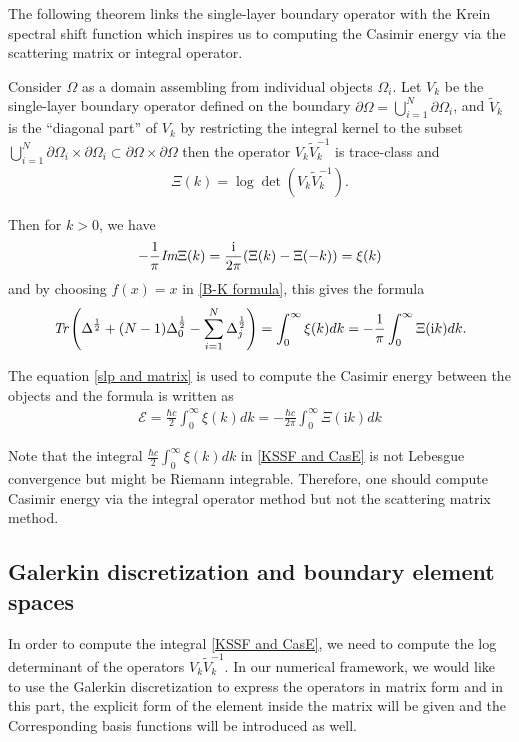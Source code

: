 The following theorem links the single-layer boundary operator with the Krein spectral shift function which inspires us to computing the Casimir energy 
via the scattering matrix or integral operator. 
\begin{theorem}\cite{hanisch2020relative}
    Consider $\Omega$ as a domain assembling from individual objects $\Omega_{i}$. Let $V_{k}$ be the single-layer boundary operator defined on the boundary 
    $\partial\Omega = \bigcup_{i = 1}^{N}\partial\Omega_{i}$, and $\tilde{V}_{k}$ is the ``diagonal part'' of $V_{k}$ by restricting the integral 
    kernel to the subset $\bigcup_{i = 1}^{N}\partial\Omega_{i}\times\partial\Omega_{i}\subset\partial\Omega\times\partial\Omega$ then the operator 
    $V_{k}\tilde{V}_{k}^{-1}$ is trace-class and 
    \begin{align*}
        \Xi(k) = \log\det\left(V_{k}\tilde{V}_{k}^{-1}\right).
    \end{align*}

    Then for $k >0$, we have 
    \begin{align*}
        -\frac{1}{\pi}\emph{\text{Im}}\Xi(k) = \frac{\mathrm{i}}{2\pi}(\Xi(k) - \Xi(-k)) = \xi(k)
    \end{align*}
    and by choosing $f(x) = x$ in \eqref{B-K formula}, this gives the formula 
    \begin{align}\label{slp and matrix}
        \emph{\text{Tr}}\left(\Delta^{\frac{1}{2}} + (N - 1)\Delta_{0}^{\frac{1}{2}} - \sum_{i = 1}^{N}\Delta_{j}^{\frac{1}{2}}\right)  = 
        \int_{0}^{\infty}\xi(k)dk = -\frac{1}{\pi}\int_{0}^{\infty}\Xi(\mathrm{i}k)dk.
    \end{align}
\end{theorem}

The equation \eqref{slp and matrix} is used to compute the Casimir energy between the objects and the formula is written as
\begin{align}\label{KSSF and CasE}
    \mathcal{E} = \frac{\hbar c}{2}\int_{0}^{\infty}\xi(k)dk = -\frac{\hbar c}{2\pi}\int_{0}^{\infty}\Xi(\mathrm{i}k)dk
\end{align}

\begin{remark}
    Note that the integral $\frac{\hbar c}{2}\int_{0}^{\infty}\xi(k)dk$ in \eqref{KSSF and CasE} is not Lebesgue convergence but might be Riemann integrable. 
    Therefore, one should compute Casimir energy via the integral operator method but not the scattering matrix method.
\end{remark}
\subsection{Galerkin discretization and boundary element spaces}
In order to compute the integral \eqref{KSSF and CasE}, we need to compute the log determinant of the operators $V_{k}\tilde{V}_{k}^{-1}$. In our numerical 
framework, we would like to use the Galerkin discretization to express the operators in matrix form and in this part, the explicit form of the element inside
the matrix will be given and the Corresponding basis functions will be introduced as well.


